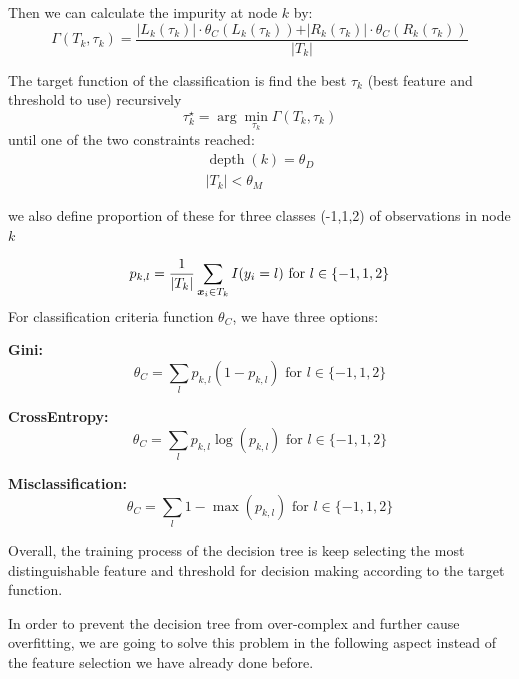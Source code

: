 Then we can calculate the impurity at node $k$ by:
\begin{equation}
	\Gamma(T_k,\tau_k) = \frac{\vert L_k(\tau_k) \vert \cdot \theta_C(L_k(\tau_k)) + \vert R_k(\tau_k) \vert \cdot \theta_C(R_k(\tau_k)) }{\vert T_{k} \vert}
\end{equation}



The target function of the classification is find the best $\tau_k$ (best feature and threshold to use) recursively 
\begin{equation}
	\tau_k^\star = \arg\min_{\tau_k}\Gamma(T_k,\tau_k)
\end{equation}
until one of the two constraints reached:
\begin{eqnarray}
	\operatorname{depth}(k) = \theta_D\\
	\vert T_{k} \vert < \theta_M
\end{eqnarray}

we also define proportion of these for three classes (-1,1,2) of observations in node $k$

\begin{equation}
	p_{k,l} = \frac{1}{\vert T_k \vert}\sum\limits_{\boldsymbol{x}_i\in T_k}I(y_i = l) \mbox{ for $l \in \{-1,1,2\}$} 
\end{equation}
For classification criteria function $\theta_C$, we have three options:

\textbf{Gini:}
\begin{equation}
	\theta_C = \sum\limits_l p_{k,l}(1-p_{k,l}) \mbox{ for $l \in \{-1,1,2\}$}
\end{equation}

\textbf{Cross\text{-}Entropy:}
\begin{equation}
	\theta_C = \sum\limits_l p_{k,l}\log(p_{k,l}) \mbox{ for $l \in \{-1,1,2\}$}
\end{equation}

\textbf{Misclassification:}
\begin{equation}
	\theta_C = \sum\limits_l 1-\max(p_{k,l}) \mbox{ for $l \in \{-1,1,2\}$}
\end{equation}

Overall, the training process of the decision tree is keep selecting the most distinguishable feature and threshold for decision making according to the target function.

In order to prevent the decision tree from over-complex and further cause overfitting, we are going to solve this problem in the following aspect instead of the feature selection we have already done before.

